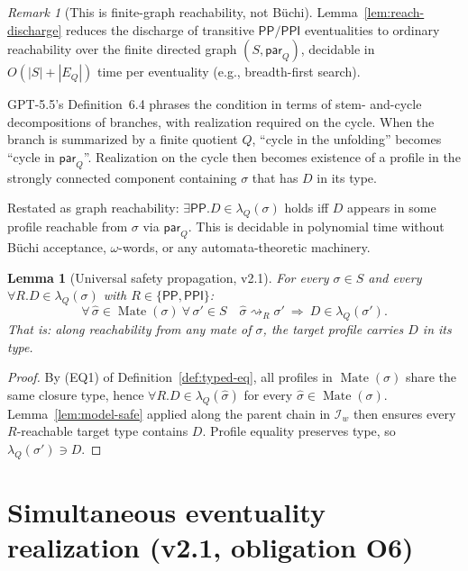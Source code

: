 \documentclass[11pt]{article}
\newtheorem{lemma}[theorem]{Lemma}
\theoremstyle{definition}
\theoremstyle{remark}
\newtheorem{remark}[theorem]{Remark}
\newcommand{\PP}{\mathsf{PP}}
\newcommand{\PPI}{\mathsf{PPI}}
\newcommand{\Mate}{\operatorname{Mate}}
\newcommand{\reach}{\rightsquigarrow}
\begin{document}
\begin{remark}[This is finite-graph reachability, not B\"uchi]
\label{rem:not-buchi}
Lemma~\ref{lem:reach-discharge} reduces the discharge of
transitive $\PP/\PPI$ eventualities to ordinary reachability over
the finite directed graph $(S, \mathsf{par}_Q)$, decidable in
$O(|S| + |E_Q|)$ time per eventuality (e.g., breadth-first search).

GPT-5.5's Definition~6.4 phrases the condition in terms of stem-
and-cycle decompositions of branches, with realization required on
the cycle.  When the branch is summarized by a finite quotient $Q$,
``cycle in the unfolding'' becomes ``cycle in $\mathsf{par}_Q$''.
Realization on the cycle then becomes existence of a profile in the
strongly connected component containing $\sigma$ that has $D$ in
its type.

Restated as graph reachability: $\exists\PP.D \in \lambda_Q(\sigma)$
holds iff $D$ appears in some profile reachable from $\sigma$ via
$\mathsf{par}_Q$.  This is decidable in polynomial time without
B\"uchi acceptance, $\omega$-words, or any automata-theoretic
machinery.
\end{remark}

\begin{lemma}[Universal safety propagation, v2.1]\label{lem:safety}
For every $\sigma \in S$ and every $\forall R.D \in
\lambda_Q(\sigma)$ with $R \in \{\PP, \PPI\}$:
\[
\forall\,\widehat{\sigma}\in\Mate(\sigma)\ \forall\,\sigma'\in S\quad
\widehat{\sigma}\reach_{R}\sigma'\ \Longrightarrow\ D\in\lambda_Q(\sigma').
\]
That is: along reachability from \emph{any} mate of $\sigma$, the
target profile carries $D$ in its type.
\end{lemma}

\begin{proof}
By (EQ1) of Definition~\ref{def:typed-eq}, all profiles in
$\Mate(\sigma)$ share the same closure type, hence
$\forall R.D\in\lambda_Q(\widehat{\sigma})$ for every
$\widehat{\sigma}\in\Mate(\sigma)$.
Lemma~\ref{lem:model-safe} applied along the parent chain in
$\mathcal{I}_w$ then ensures every $R$-reachable target type
contains $D$.  Profile equality preserves type, so
$\lambda_Q(\sigma') \ni D$.
\end{proof}


\section{Simultaneous eventuality realization (v2.1, obligation O6)}
\label{sec:simul}
\end{document}
